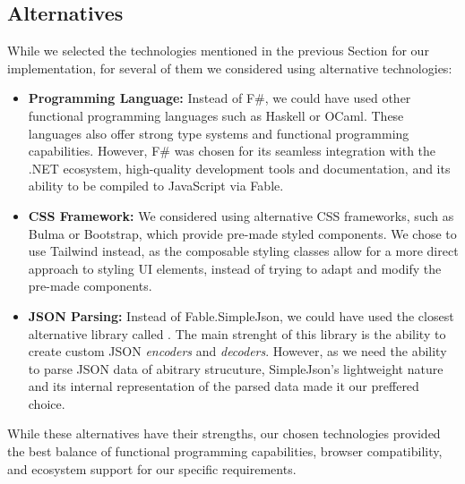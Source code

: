 \subsection{Alternatives}
While we selected the technologies mentioned in the previous Section for our implementation, for several of them we considered using alternative technologies:
\begin{itemize}
	\item \textbf{Programming Language:} Instead of F\#, we could have used other functional programming languages such as Haskell or OCaml.
	      These languages also offer strong type systems and functional programming capabilities.
	      However, F\# was chosen for its seamless integration with the .NET ecosystem, high-quality development tools and documentation, and its ability to be compiled to JavaScript via Fable.

	\item \textbf{CSS Framework:} We considered using alternative CSS frameworks, such as Bulma or Bootstrap, which provide pre-made styled components.
	      We chose to use Tailwind instead, as the composable styling classes allow for a more direct approach to styling UI elements, instead of trying to adapt and modify the pre-made components.

	\item \textbf{JSON Parsing:} Instead of Fable.SimpleJson, we could have used the closest alternative library called \citet{thoth}.
	      The main strenght of this library is the ability to create custom JSON \emph{encoders} and \emph{decoders}.
	      However, as we need the ability to parse JSON data of abitrary strucuture, SimpleJson's lightweight nature and its internal representation of the parsed data made it our preffered choice.
\end{itemize}
While these alternatives have their strengths, our chosen technologies provided the best balance of functional programming capabilities, browser compatibility, and ecosystem support for our specific requirements.


